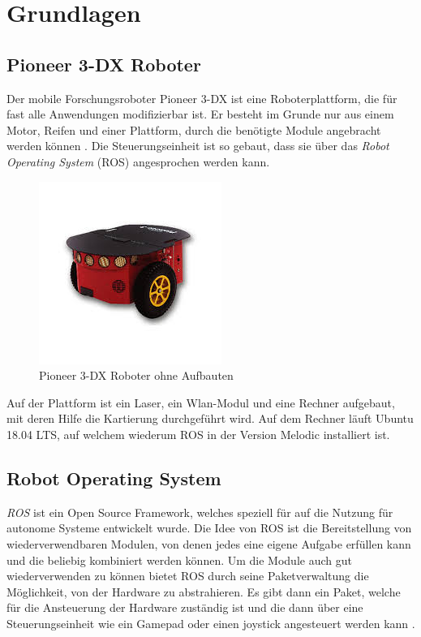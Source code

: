 \documentclass{scrartcl}%
\begin{document}
\newpage
\section{Grundlagen}
\subsection{Pioneer 3-DX Roboter}
Der mobile Forschungsroboter Pioneer 3-DX ist eine Roboterplattform, die für fast alle Anwendungen modifizierbar ist. Er besteht im Grunde nur aus einem Motor, Reifen und einer Plattform, durch die benötigte Module angebracht werden können \cite{pioneer}. Die Steuerungseinheit ist so gebaut, dass sie über das \textit{Robot Operating System} (ROS) angesprochen werden kann.

\begin{figure}[h]
	\centering
	\includegraphics{bilder/pioneerRoh.jpg}
	\caption{Pioneer 3-DX Roboter ohne Aufbauten \cite{pioneer}}
	\label{pioneerRoh}
\end{figure}

Auf der Plattform ist ein Laser, ein Wlan-Modul und eine Rechner aufgebaut, mit deren Hilfe die Kartierung durchgeführt wird. Auf dem Rechner läuft Ubuntu 18.04 LTS, auf welchem wiederum ROS in der Version Melodic installiert ist.

\subsection{Robot Operating System}
\textit{ROS} ist ein Open Source Framework, welches speziell für auf die Nutzung für autonome Systeme entwickelt wurde. Die Idee von ROS ist die Bereitstellung von wiederverwendbaren Modulen, von denen jedes eine eigene Aufgabe erfüllen kann und die beliebig kombiniert werden können. Um die Module auch gut wiederverwenden zu können bietet ROS durch seine Paketverwaltung die Möglichkeit, von der Hardware zu abstrahieren. Es gibt dann ein Paket, welche für die Ansteuerung der Hardware zuständig ist und die dann über eine Steuerungseinheit wie ein Gamepad oder einen joystick angesteuert werden kann \cite{rosIntro}.
\end{document}
